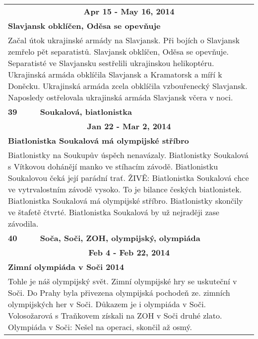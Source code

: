 \begin{tabularx}{\linewidth}{l l}
                \multicolumn{2}{c}{\bf Apr 15 - May 16, 2014} \\
                \multicolumn{2}{p{\linewidth}}{\bf Slavjansk obklíčen, Oděsa se opevňuje} \\
                \multicolumn{2}{p{\linewidth}}{Začal útok ukrajinské armády na Slavjansk. Při bojích o Slavjansk zemřelo pět separatistů. Slavjansk obklíčen, Oděsa se opevňuje. Separatisté ve Slavjansku sestřelili ukrajinskou helikoptéru. Ukrajinská armáda obklíčila Slavjansk a Kramatorsk a míří k Doněcku. Ukrajinská armáda zcela obklíčila vzbouřenecký Slavjansk. Naposledy ostřelovala ukrajinská armáda Slavjansk včera v noci.} \\ \midrule
                [1.5pt]

            \bf 39 & \bf Soukalová, biatlonistka \\ \midrule
            
                \multicolumn{2}{c}{\bf Jan 22 - Mar 2, 2014} \\
                \multicolumn{2}{p{\linewidth}}{\bf Biatlonistka Soukalová má olympijské stříbro} \\
                \multicolumn{2}{p{\linewidth}}{Biatlonistky na Soukupův úspěch nenavázaly. Biatlonistky Soukalová s Vítkovou dohánějí manko ve stíhacím závodě. Biatlonistku Soukalovou čeká její parádní trať. ŽIVĚ: Biatlonistka Soukalová chce ve vytrvalostním závodě vysoko. To je bilance českých biatlonistek. Biatlonistka Soukalová má olympijské stříbro. Biatlonistky skončily ve štafetě čtvrté. Biatlonistka Soukalová by už nejraději zase závodila.} \\ \midrule
                [1.5pt]

            \bf 40 & \bf Soča, Soči, ZOH, olympijský, olympiáda \\ \midrule
            
                \multicolumn{2}{c}{\bf Feb 4 - Feb 22, 2014} \\
                \multicolumn{2}{p{\linewidth}}{\bf Zimní olympiáda v Soči 2014} \\
                \multicolumn{2}{p{\linewidth}}{Tohle je náš olympijský svět. Zimní olympijské hry se uskuteční v Soči. Do Prahy byla přivezena olympijská pochodeň ze. zimních olympijských her v Soči. Důkazem je i olympiáda v Soči. Volosožarová s Traňkovem získali na ZOH v Soči druhé zlato. Olympiáda v Soči: Nešel na operaci, skončil až osmý.} \\ \midrule
                [1.5pt]


\end{tabularx}
